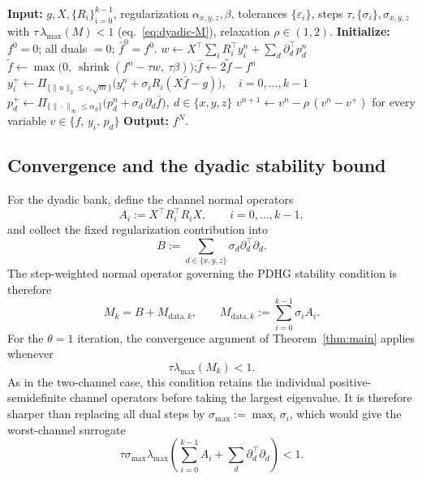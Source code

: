 \documentclass{article}
\begin{document}
\begin{algorithm}[t]
\caption{Dyadic $k$-channel PDHG (He--Yuan relaxed)}
\label{alg:dyadic}
\begin{algorithmic}[1]
\State \textbf{Input:} $g,X,\{R_i\}_{i=0}^{k-1}$, regularization $\alpha_{x,y,z},\beta$, tolerances $\{\varepsilon_i\}$, steps $\tau,\{\sigma_i\},\sigma_{x,y,z}$ with $\tau\,\lambda_{\max}(M)<1$ (eq.~\eqref{eq:dyadic-M}), relaxation $\rho\in(1,2)$.
\State \textbf{Initialize:} $f^{0}=0$; all duals $=0$; $\bar f^{0}=f^{0}$.
  \State $w\gets X^\top\!\sum_{i}R_{i}^\top y_{i}^{n}+\sum_d\partial_d^\top p_d^{n}$
  \State $\tilde f\gets \max\!\bigl(0,\ \operatorname{shrink}(f^{n}-\tau w,\ \tau\beta)\bigr)$;\quad $\bar f\gets 2\tilde f-f^{n}$ 
  \State $y_{i}^{+}\gets \Pi_{\{\|u\|_2\le\varepsilon_i\sqrt m\}}\!\bigl(y_{i}^{n}+\sigma_{i}R_{i}(X\bar f-g)\bigr),\quad i=0,\dots,k-1$
  \State $p_{d}^{+}\gets \Pi_{\{\|\cdot\|_\infty\le\alpha_d\}}\!\bigl(p_{d}^{n}+\sigma_{d}\,\partial_d\bar f\bigr),\ d\in\{x,y,z\}$
  \State $v^{n+1}\gets v^{n}-\rho\,(v^{n}-v^{+})$ for every variable $v\in\{f,\,y_i,\,p_d\}$ 
\EndFor
\State \textbf{Output:} $f^{N}$.
\end{algorithmic}
\end{algorithm}

\subsection{Convergence and the dyadic stability bound}

For the dyadic bank, define the channel normal operators
\[
A_i
:=
X^\top R_i^\top R_iX,
\qquad
i=0,\ldots,k-1,
\]
and collect the fixed regularization contribution into
\[
B
:=
\sum_{d\in\{x,y,z\}}
\sigma_d\partial_d^\top\partial_d.
\]
The step-weighted normal operator governing the PDHG stability
condition is therefore
\begin{equation}
\label{eq:dyadic-M}
M_k
=
B+M_{\mathrm{data},k},
\qquad
M_{\mathrm{data},k}
:=
\sum_{i=0}^{k-1}\sigma_iA_i.
\end{equation}
For the $\theta=1$ iteration, the convergence argument of
Theorem~\ref{thm:main} applies whenever
\begin{equation}
\label{eq:dyadic-cond}
\tau\lambda_{\max}(M_k)<1.
\end{equation}
As in the two-channel case, this condition retains the individual
positive-semidefinite channel operators before taking the largest
eigenvalue.  It is therefore sharper than replacing all dual steps
by $\sigma_{\max}:=\max_i\sigma_i$, which would give the
worst-channel surrogate
\[
\tau\sigma_{\max}
\lambda_{\max}
\left(
\sum_{i=0}^{k-1}A_i
+
\sum_d\partial_d^\top\partial_d
\right)<1.
\]
\end{document}

